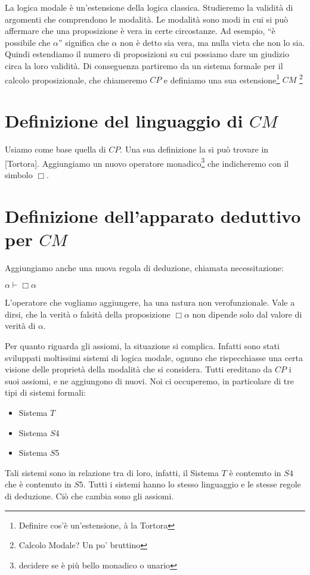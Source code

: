 \documentclass[a4paper, 12pt]{article}
\begin{document}
La logica modale è un'estensione della logica classica.
Studieremo la validità di argomenti che comprendono le modalità.
Le modalità sono modi in cui si può affermare che una proposizione è vera in certe circostanze.
Ad esempio, ``è possibile che $\alpha$'' significa che $\alpha$ non è detto sia vera, ma nulla vieta che non lo sia.
Quindi estendiamo il numero di proposizioni su cui possiamo dare un giudizio circa la loro validità.
Di conseguenza partiremo da un sistema formale per il calcolo proposizionale, che chiameremo $CP$
e definiamo una sua estensione\footnote{Definire cos'è un'estensione, à la Tortora} $CM$ \footnote{Calcolo Modale? Un po' bruttino}

\section{Definizione del linguaggio di $CM$}
Usiamo come base quella di $CP$. Una sua definizione la si può trovare in [Tortora].
Aggiungiamo un nuovo operatore monadico\footnote{decidere se è più bello monadico o unario}
che indicheremo con il simbolo $\Box$.

\section{Definizione dell'apparato deduttivo per $CM$}
Aggiungiamo anche una nuova regola di deduzione, chiamata necessitazione:

$\alpha \vdash \Box \alpha$

L'operatore che vogliamo aggiungere, ha una natura non verofunzionale. Vale a dirsi,
che la verità o falsità della proposizione $\Box \alpha$ non dipende solo
dal valore di verità di $\alpha$.

Per quanto riguarda gli assiomi, la situazione si complica. Infatti sono stati sviluppati moltissimi sistemi di logica modale,
ognuno che rispecchiasse una certa visione delle proprietà della modalità che si considera.
Tutti ereditano da $CP$ i suoi assiomi, e ne aggiungono di nuovi.
Noi ci occuperemo, in particolare di tre tipi di sistemi formali:
\begin{itemize}
\item Sistema $T$
\item Sistema $S4$
\item Sistema $S5$
\end{itemize}

Tali sistemi sono in relazione tra di loro, infatti, il Sistema $T$ è contenuto in $S4$ che è contenuto in $S5$.
Tutti i sistemi hanno lo stesso linguaggio e le stesse regole di deduzione. Ci\`o che cambia sono gli assiomi.
\end{document}
